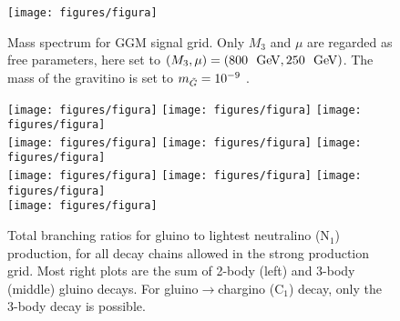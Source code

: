 
\begin{figure}[ht!]
   \centering
   \texttt{[image: figures/figura]} %
   \caption{Mass spectrum for GGM signal grid. Only $M_3$ and $\mu$ are regarded as free parameters, here set to $(M_3, \mu) = (800~\gev, 250~\gev)$. The mass of
the gravitino is set to $m_{\tilde{G}}=10^{-9}$ \gev.}
   \label{fig:mass_spectra}
\end{figure}

\begin{figure}[ht!] %
   \centering
   \texttt{[image: figures/figura]}  %
   \texttt{[image: figures/figura]}  %
   \texttt{[image: figures/figura]} \\ %
   \texttt{[image: figures/figura]}  %
   \texttt{[image: figures/figura]}  %
   \texttt{[image: figures/figura]} \\ %
   \texttt{[image: figures/figura]}  %
   \texttt{[image: figures/figura]}  %
   \texttt{[image: figures/figura]} \\ %
   \texttt{[image: figures/figura]} \\ %

   \caption{Total branching ratios for gluino to lightest neutralino (N$_{1}$) production, for all decay chains allowed in the strong production grid. Most right plots are the sum of 2-body (left) and 3-body (middle) gluino decays. For gluino$\rightarrow$chargino (C$_{1}$) decay, only the 3-body decay is possible.}
   \label{fig:br_gl_n1}
\end{figure}

